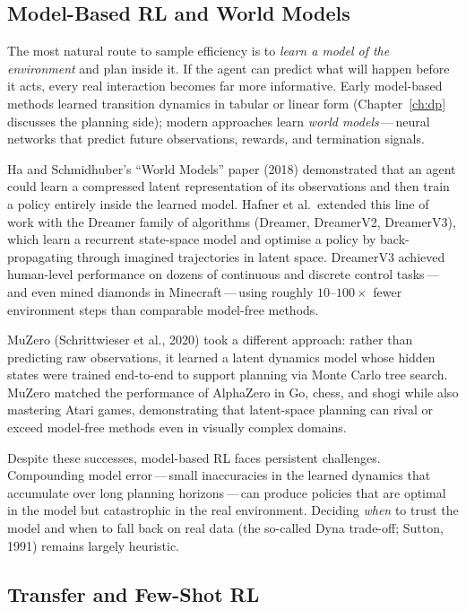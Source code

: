 \subsection{Model-Based RL and World Models}

The most natural route to sample efficiency is to \emph{learn a model
of the environment} and plan inside it.  If the agent can predict what
will happen before it acts, every real interaction becomes far more
informative.  Early model-based methods learned transition dynamics in
tabular or linear form (Chapter~\ref{ch:dp} discusses the planning
side); modern approaches learn \emph{world models}\,---\,neural
networks that predict future observations, rewards, and termination
signals.

Ha and Schmidhuber's ``World Models'' paper (2018) demonstrated that an
agent could learn a compressed latent representation of its
observations and then train a policy entirely inside the learned
model.  Hafner et al.\ extended this line of work with the Dreamer
family of algorithms (Dreamer, DreamerV2, DreamerV3), which learn a
recurrent state-space model and optimise a policy by
back-propagating through imagined trajectories in latent space.
DreamerV3 achieved human-level performance on dozens of continuous and
discrete control tasks\,---\,and even mined diamonds in Minecraft\,---\,using
roughly $10$--$100\times$ fewer environment steps than comparable
model-free methods.

MuZero (Schrittwieser et al., 2020) took a different approach:
rather than predicting raw observations, it learned a latent dynamics
model whose hidden states were trained end-to-end to support planning
via Monte Carlo tree search.  MuZero matched the performance of
AlphaZero in Go, chess, and shogi while also mastering Atari games,
demonstrating that latent-space planning can rival or exceed
model-free methods even in visually complex domains.

Despite these successes, model-based RL faces persistent challenges.
Compounding model error\,---\,small inaccuracies in the learned
dynamics that accumulate over long planning horizons\,---\,can produce
policies that are optimal in the model but catastrophic in the real
environment.  Deciding \emph{when} to trust the model and when to
fall back on real data (the so-called Dyna trade-off; Sutton, 1991)
remains largely heuristic.

\subsection{Transfer and Few-Shot RL}

